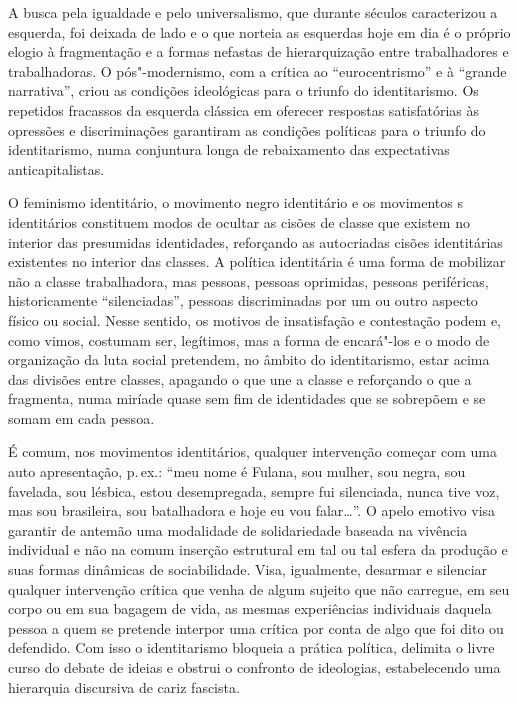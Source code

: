 A busca pela igualdade e pelo universalismo, que durante séculos
caracterizou a esquerda, foi deixada de lado e o que norteia as
esquerdas hoje em dia é o próprio elogio à fragmentação e a formas
nefastas de hierarquização entre trabalhadores e trabalhadoras. O
pós"-modernismo, com a crítica ao ``eurocentrismo'' e à ``grande
narrativa'', criou as condições ideológicas para o triunfo do
identitarismo. Os repetidos fracassos da esquerda clássica em oferecer
respostas satisfatórias às opressões e discriminações garantiram as
condições políticas para o triunfo do identitarismo, numa conjuntura
longa de rebaixamento das expectativas anticapitalistas.

O feminismo identitário, o movimento negro identitário e os movimentos
s identitários constituem modos de ocultar as cisões de classe que
existem no interior das presumidas identidades, reforçando as
autocriadas cisões identitárias existentes no interior das classes. A
política identitária é uma forma de mobilizar não a classe trabalhadora,
mas pessoas, pessoas oprimidas, pessoas periféricas, historicamente
``silenciadas'', pessoas discriminadas por um ou outro aspecto físico ou
social. Nesse sentido, os motivos de insatisfação e contestação podem e,
como vimos, costumam ser, legítimos, mas a forma de encará"-los e o modo
de organização da luta social pretendem, no âmbito do identitarismo,
estar acima das divisões entre classes, apagando o que une a classe e
reforçando o que a fragmenta, numa miríade quase sem fim de identidades
que se sobrepõem e se somam em cada pessoa.

É comum, nos movimentos identitários, qualquer intervenção começar com
uma auto apresentação, p.\,ex.: ``meu nome é Fulana, sou mulher, sou
negra, sou favelada, sou lésbica, estou desempregada, sempre fui
silenciada, nunca tive voz, mas sou brasileira, sou batalhadora e hoje
eu vou falar\ldots{}''. O apelo emotivo visa garantir de antemão uma
modalidade de solidariedade baseada na vivência individual e não na
comum inserção estrutural em tal ou tal esfera da produção e suas formas
dinâmicas de sociabilidade. Visa, igualmente, desarmar e silenciar
qualquer intervenção crítica que venha de algum sujeito que não
carregue, em seu corpo ou em sua bagagem de vida, as mesmas experiências
individuais daquela pessoa a quem se pretende interpor uma crítica por
conta de algo que foi dito ou defendido. Com isso o identitarismo
bloqueia a prática política, delimita o livre curso do debate de ideias
e obstrui o confronto de ideologias, estabelecendo uma hierarquia
discursiva de cariz fascista.

